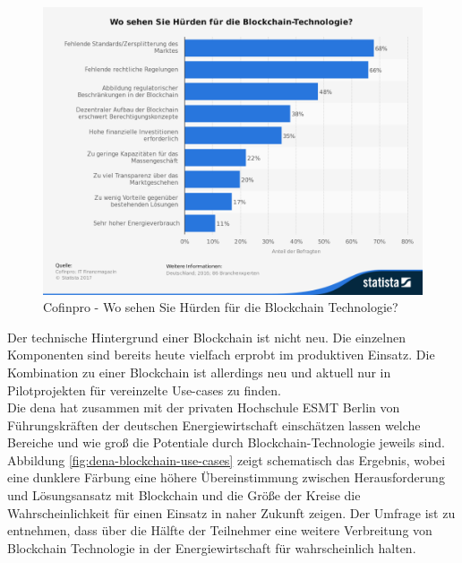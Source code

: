 \begin{figure}[h!]
	\centering
	\includegraphics[width=0.7\linewidth]{pictures/Statista-Huerden-Blockchain-2016}
	\caption[Statista Blockchain Umfrage]{Cofinpro - Wo sehen Sie Hürden für die Blockchain Technologie? \cite{Cofinpro}}
	\label{fig:statista-huerden-blockchain-2016}
\end{figure}

Der technische Hintergrund einer Blockchain ist nicht neu. Die einzelnen Komponenten sind bereits heute vielfach erprobt im produktiven Einsatz. \cite{Diffie1976}\cite{Steinmetz2005} Die Kombination zu einer Blockchain ist allerdings neu und aktuell nur in Pilotprojekten für vereinzelte Use-cases zu finden.\\

Die \ac{dena} hat zusammen mit der privaten Hochschule ESMT Berlin von Führungskräften der deutschen Energiewirtschaft einschätzen lassen welche Bereiche und wie groß die Potentiale durch Blockchain-Technologie jeweils sind. Abbildung \ref{fig:dena-blockchain-use-cases} zeigt schematisch das Ergebnis, wobei eine dunklere Färbung eine höhere Übereinstimmung zwischen Herausforderung und Lösungsansatz mit Blockchain und die Größe der Kreise die Wahrscheinlichkeit für einen Einsatz in naher Zukunft zeigen. Der Umfrage ist zu entnehmen, dass über die Hälfte der Teilnehmer eine weitere Verbreitung von Blockchain Technologie in der Energiewirtschaft für wahrscheinlich halten. \cite[vgl.]{EnergieAgentur2016}\\


